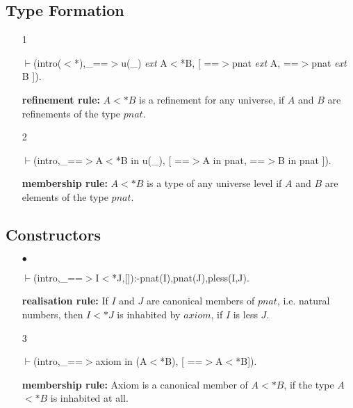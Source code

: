 \documentclass[11pt]{report}
\begin{document}
 \subsection{Type Formation}
  
 \begin{enumerate}
 \item[1]
\begin{sf}\begin{tabbing}
$\vdash$(intro($<$*),\_\hspace{0.1em}==$>$u(\_\hspace{0.1em}) \mbox{\it ext} A$<$*B, [ ==$>$pnat \mbox{\it ext} A, ==$>$pnat \mbox{\it ext} B ]).
\end{tabbing}\end{sf}

 {\bf refinement rule:} $A<*B$ is a refinement for any universe,
 if $A$ and $B$ are refinements of the type $pnat$.
  
 \item[2]
\begin{sf}\begin{tabbing}
$\vdash$(intro,\_\hspace{0.1em}==$>$A$<$*B in u(\_\hspace{0.1em}), [ ==$>$A in pnat, ==$>$B in pnat ]).
\end{tabbing}\end{sf}

 {\bf membership rule:} $A<*B$ is a type of any universe level
 if $A$ and $B$ are elements of the type $pnat$.
  
 \end{enumerate}
  
 \subsection{Constructors}
  
 \begin{enumerate}
 \item[$\bullet$]
\begin{sf}\begin{tabbing}
$\vdash$(intro,\_\hspace{0.1em}==$>$I$<$*J,[]):-pnat(I),pnat(J),pless(I,J).
\end{tabbing}\end{sf}

 {\bf realisation rule:}
 If $I$ and $J$ are canonical members of $pnat$, i.e. natural
 numbers, then $I$$<*J$ is inhabited by $axiom$, if $I$ is less $J$.
  
 \item[3]
\begin{sf}\begin{tabbing}
$\vdash$(intro,\_\hspace{0.1em}==$>$axiom in (A$<$*B), [ ==$>$A$<$*B]).
\end{tabbing}\end{sf}

 {\bf membership rule:}
 Axiom is a canonical member of $A$$<*$$B$, if the type $A$$<*$$B$
 is inhabited at all.
  
 \end{enumerate}
  
\end{document}
